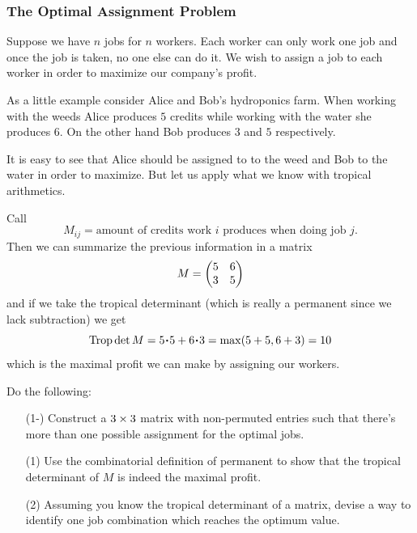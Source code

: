 \documentclass[12pt]{memoir}
\DeclareMathOperator{\Trop}{Trop}
\begin{document}
\subsubsection{The Optimal Assignment Problem}

Suppose we have $n$ jobs for $n$ workers. Each worker can only work one job and once the job is taken, no one else can do it. We wish to assign a job to each worker in order to maximize our company's profit.

\begin{Ex}
    As a little example consider Alice and Bob's hydroponics farm. When working with the weeds Alice produces $5$ credits while working with the water she produces $6$. On the other hand Bob produces $3$ and $5$ respectively.\par 
    It is easy to see that Alice should be assigned to to the weed and Bob to the water in order to maximize. But let us apply what we know with tropical arithmetics.\par 
    Call 
    $$M_{ij}=\text{amount of credits work }i\text{ produces when doing job }j.$$
    Then we can summarize the previous information in a matrix 
    $$M=\begin{pmatrix} 5 & 6 \\ 3 & 5 \end{pmatrix}$$
    and if we take the tropical determinant (which is really a permanent since we lack subtraction) we get
    $$\Trop\det M=5\.5+6\.3=\max(5+5,6+3)=10$$
    which is the maximal profit we can make by assigning our workers.
\end{Ex}

\begin{Ej}
    Do the following:
    \begin{enumerate}[i)]
        \itemsep=-0.4em
        \item[(1-)] Construct a $3\times3$ matrix with non-permuted entries such that there's more than one possible assignment for the optimal jobs.
        \item[(1)] Use the combinatorial definition of permanent to show that the tropical determinant of $M$ is indeed the maximal profit. 
        \item[(2)] Assuming you know the tropical determinant of a matrix, devise a way to identify one job combination which reaches the optimum value. 
    \end{enumerate}
\end{Ej}
\end{document}
